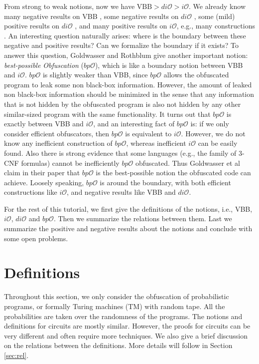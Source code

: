 \documentclass[12pt]{article}
\newcommand{\io}{i\mathcal{O}}
\newcommand{\dio}{di\mathcal{O}}
\newcommand{\bpo}{bp\mathcal{O}}
\theoremstyle{definition}
\begin{document}
From strong to weak notions, now we have $\mathrm{VBB} > di\mathcal{O} > i\mathcal{O}$. We already know many negative results on VBB \cite{barak2001possibility,goldwasser2005impossibility,bitansky2014impossibility}, some negative results on $\dio$ \cite{garg2014implausibility}, some (mild) positive results on $\dio$ \cite{boyle2014extractability,ananth2013differing}, and many positive results on $\io$, e.g., many constructions \cite{garg2013candidate,pass2014,gentry2015,bitansky2015,koppula2015}. An interesting question naturally arises: where is the boundary between these negative and positive results? Can we formalize the boundary if it exists? To answer this question, Goldwasser and Rothblum \cite{goldwasser2007best} give another important notion: \emph{best-possible Obfuscation} ($\bpo$), which is like a boundary notion between VBB and $\io$. $\bpo$ is slightly weaker than VBB, since $\bpo$ allows the obfuscated program to leak some non black-box information. However, the amount of leaked non black-box information should be minimized in the sense that any information that is not hidden by the obfuscated program is also not hidden by any other similar-sized program with the same functionality. It turns out that $\bpo$ is exactly between VBB and $\io$, and an interesting fact of $\bpo$ is: if we only consider efficient obfuscators, then $\bpo$ is equivalent to $\io$. However, we do not know any inefficient construction of $\bpo$, whereas inefficient $\io$ can be easily found. Also there is strong evidence that some languages (e.g., the family of 3-CNF formulas) cannot be inefficiently $\bpo$ obfuscated. Thus Goldwasser et al claim in their paper \cite{goldwasser2007best} that $\bpo$ is the best-possible notion the obfuscated code can achieve. Loosely speaking, $\bpo$ is around the boundary, with both efficient constructions like $\io$, and negative results like VBB and $\dio$.

For the rest of this tutorial, we first give the definitions of the notions, i.e., VBB, $\io$, $\dio$ and $\bpo$. Then we summarize the relations between them. Last we summarize the positive and negative results about the notions and conclude with some open problems.

\newcommand{\bigoh}{\mathcal{O}}
\newcommand{\M}{\mathcal{M}}
\newcommand{\VBB}{\mathsf{VBB}}
\section{Definitions}
Throughout this section, we only consider the obfuscation of probabilistic programs, or formally Turing machines (TM) with random tape. All the probabilities are taken over the randomness of the programs. The notions and definitions for circuits are mostly similar. However, the proofs for circuits can be very different and often require more techniques. We also give a brief discussion on the relations between the definitions. More details will follow in Section \ref{sec:rel}.
\end{document}
